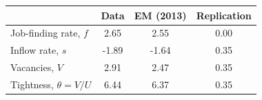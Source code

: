 \begin{tabular}{lccc}
\toprule
 & Data & EM (2013) & Replication \\
\midrule
Job-finding rate, $f$ & 2.65 & 2.55 & 0.00 \\
Inflow rate, $s$ & -1.89 & -1.64 & 0.35 \\
Vacancies, $V$ & 2.91 & 2.47 & 0.35 \\
Tightness, $\theta = V/U$ & 6.44 & 6.37 & 0.35 \\
\bottomrule
\end{tabular}
